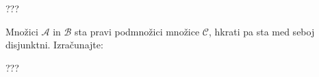 \documentclass[addpoints]{exam}
\begin{document}
\begin{questions}

    \begin{solution}[10cm]
???
    \end{solution}



    \question[5]
    Množici $\mathcal{A}$ in $\mathcal{B}$ sta pravi podmnožici množice $\mathcal{C}$, hkrati pa sta med seboj disjunktni. Izračunajte:


    \begin{solution}[1cm]
???
    \end{solution}





\end{questions}
\end{document}
